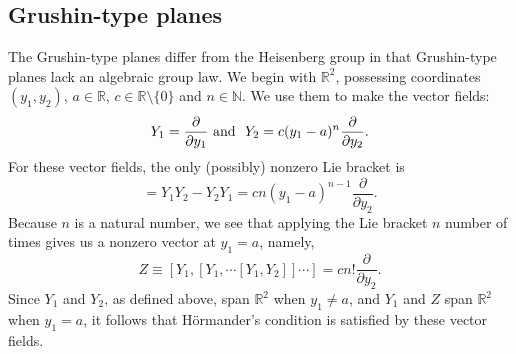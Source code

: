 \documentclass[12pt]{amsart}
\theoremstyle{plain}
\theoremstyle{definition}
\numberwithin{equation}{section}
\begin{document}
\subsection{Grushin-type planes}
The Grushin-type planes differ from the Heisenberg group in that Grushin-type planes lack an algebraic group law. We begin with $\mathbb{R}^{2}$, possessing coordinates $(y_1, y_2)$, $a\in \mathbb{R}$, $c\in \mathbb{R}\setminus\{0\}$ and $n\in \mathbb{N}$.  We use them to make the vector fields:
\begin{equation*}
Y_1  =  \frac{\partial}{\partial y_1} \ \textmd{and}\ \
Y_2  =   c(y_1-a)^n\frac{\partial}{\partial y_2}.
\end{equation*}
For these vector fields, the only (possibly) nonzero Lie bracket is
\begin{equation*}
[Y_1,Y_2]=Y_1Y_2-Y_2Y_1=cn(y_1-a)^{n-1}\frac{\partial}{\partial y_2}.
\end{equation*}
Because $n$ is a natural number, we see that applying the Lie bracket $n$ number of times gives us a nonzero vector at $y_1=a$, namely,
\begin{equation*}
Z\equiv[Y_1,[Y_1,\cdots[Y_1,Y_2]]\cdots]= cn!\frac{\partial}{\partial y_2}.
\end{equation*}
Since $Y_1$ and $Y_2$, as defined above, span $\mathbb{R}^{2}$ when $y_1 \neq a$, and $Y_1$ and $Z$ span $\mathbb{R}^2$ when $y_1=a$, it follows that H\"{o}rmander's condition is satisfied by these vector fields.
\end{document}
